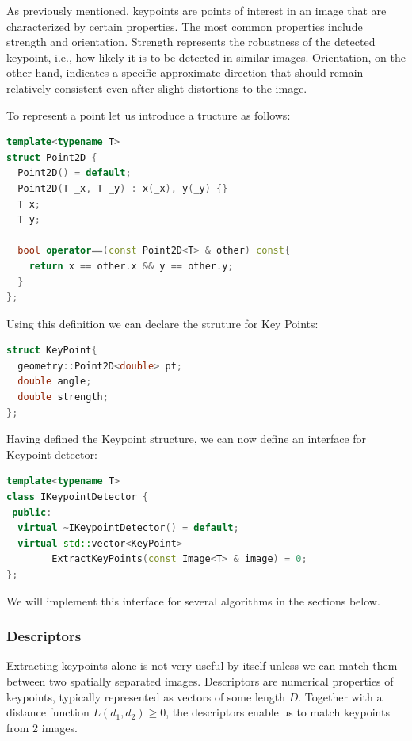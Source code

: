 \documentclass[11pt]{book}
\begin{document}
As previously mentioned, keypoints are points of interest in an image that are characterized by certain properties. The most common properties include strength and orientation. Strength represents the robustness of the detected keypoint, i.e., how likely it is to be detected in similar images. Orientation, on the other hand, indicates a specific approximate direction that should remain relatively consistent even after slight distortions to the image.
 
 
 To represent a point let us introduce a tructure as follows:
 \begin{lstlisting}[language=C++, caption={Point2D class}]
template<typename T>
struct Point2D {
  Point2D() = default;
  Point2D(T _x, T _y) : x(_x), y(_y) {}
  T x;
  T y;

  bool operator==(const Point2D<T> & other) const{
    return x == other.x && y == other.y;
  }
};
 \end{lstlisting}

 Using this definition we can declare the struture for Key Points:

 \begin{lstlisting}[language=C++, caption={KeyPoint class}]
struct KeyPoint{
  geometry::Point2D<double> pt;
  double angle;
  double strength;
};
\end{lstlisting}
 
 
 Having defined the Keypoint structure, we can now define an interface for Keypoint detector:
 
 \begin{lstlisting}[language=C++, caption={IKeypointDetector interface}]
template<typename T>
class IKeypointDetector {
 public:
  virtual ~IKeypointDetector() = default;
  virtual std::vector<KeyPoint> 
        ExtractKeyPoints(const Image<T> & image) = 0;
};
\end{lstlisting}
  
 
 We will implement this interface for several algorithms in the sections below.

\subsubsection{Descriptors}

Extracting keypoints alone is not very useful by itself unless we can match them between two spatially separated images. Descriptors are numerical properties of keypoints, typically represented as vectors of some length $D$. Together with a distance function $L(d_1, d_2) \geq 0$, the descriptors enable us to match keypoints from 2 images. 
\end{document}
